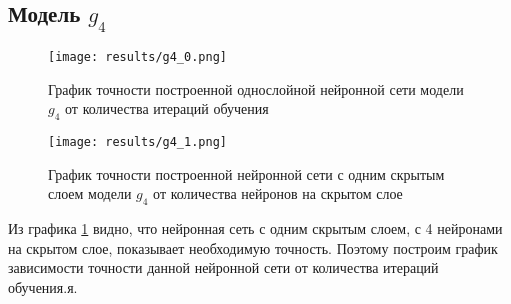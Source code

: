 %	
%	
%
%
%	
%
%
%	


\subsection{Модель $g_4$}
\begin{figure}[H]
	\texttt{[image: results/g4\_0.png]}
	
	\caption{График точности построенной однослойной нейронной сети модели $g_4$ от количества итераций обучения}
	
\end{figure}


\begin{figure}[H]
	\texttt{[image: results/g4\_1.png]}
	
	\caption{График точности построенной нейронной сети с одним скрытым слоем модели $g_4$ от количества нейронов на скрытом слое}
	\label{graphic4}
\end{figure}

Из графика \ref{graphic4} видно, что нейронная сеть с одним скрытым слоем, с 4 нейронами на скрытом слое, показывает необходимую точность. Поэтому построим график зависимости точности данной нейронной сети от количества итераций обучения.я.


